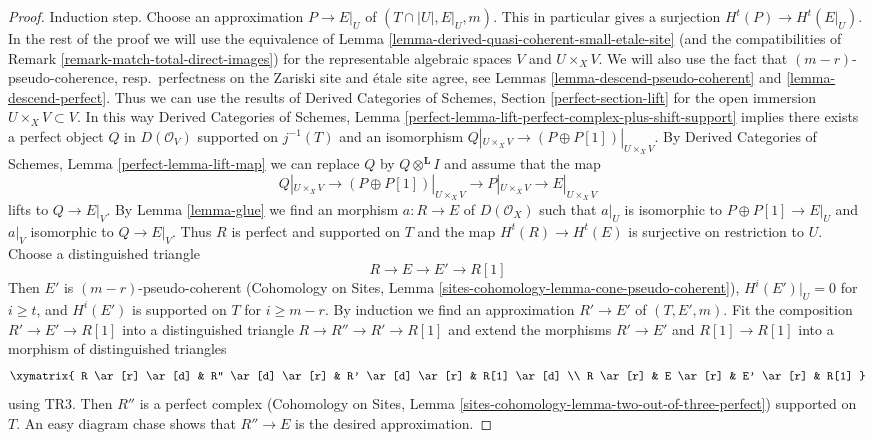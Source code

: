 \begin{proof}
\medskip\noindent
Induction step. Choose an approximation $P \to E|_U$ of
$(T \cap |U|, E|_U, m)$. This in particular gives a surjection
$H^t(P) \to H^t(E|_U)$.
In the rest of the proof we will use the equivalence of
Lemma \ref{lemma-derived-quasi-coherent-small-etale-site}
(and the compatibilities of Remark \ref{remark-match-total-direct-images})
for the representable algebraic spaces $V$ and $U \times_X V$.
We will also use the fact that $(m - r)$-pseudo-coherence,
resp.\ perfectness on the Zariski site and \'etale site agree, see
Lemmas \ref{lemma-descend-pseudo-coherent} and
\ref{lemma-descend-perfect}.
Thus we can use the results of
Derived Categories of Schemes, Section \ref{perfect-section-lift}
for the open immersion $U \times_X V \subset V$. In this way
Derived Categories of Schemes,
Lemma \ref{perfect-lemma-lift-perfect-complex-plus-shift-support}
implies there exists a perfect object $Q$ in $D(\mathcal{O}_V)$
supported on $j^{-1}(T)$ and an isomorphism
$Q|_{U \times_X V} \to (P \oplus P[1])|_{U \times_X V}$. By
Derived Categories of Schemes, Lemma \ref{perfect-lemma-lift-map}
we can replace $Q$ by $Q \otimes^\mathbf{L} I$
and assume that the map
$$
Q|_{U \times_X V} \longrightarrow
(P \oplus P[1])|_{U \times_X V} \longrightarrow
P|_{U \times_X V} \longrightarrow E|_{U \times_X V}
$$
lifts to $Q \to E|_V$. By Lemma \ref{lemma-glue}
we find an morphism $a : R \to E$ of $D(\mathcal{O}_X)$
such that $a|_U$ is isomorphic to $P \oplus P[1] \to E|_U$
and $a|_V$ isomorphic to $Q \to E|_V$.
Thus $R$ is perfect and supported on $T$
and the map $H^t(R) \to H^t(E)$ is surjective on restriction to $U$.
Choose a distinguished triangle
$$
R \to E \to E' \to R[1]
$$
Then $E'$ is $(m - r)$-pseudo-coherent
(Cohomology on Sites, Lemma \ref{sites-cohomology-lemma-cone-pseudo-coherent}),
$H^i(E')|_U = 0$ for $i \geq t$, and
$H^i(E')$ is supported on $T$ for $i \geq m - r$.
By induction we find an approximation $R' \to E'$
of $(T, E', m)$. Fit the composition $R' \to E' \to R[1]$
into a distinguished triangle $R \to R'' \to R' \to R[1]$
and extend the morphisms $R' \to E'$ and $R[1] \to R[1]$ into
a morphism of distinguished triangles
$$
\xymatrix{
R \ar[r] \ar[d] & R'' \ar[d] \ar[r] & R' \ar[d] \ar[r] & R[1] \ar[d] \\
R \ar[r] &  E \ar[r] & E' \ar[r] & R[1]
}
$$
using TR3. Then $R''$ is a perfect complex
(Cohomology on Sites, Lemma
\ref{sites-cohomology-lemma-two-out-of-three-perfect})
supported on $T$. An easy diagram chase shows that $R'' \to E$ is the desired
approximation.
\end{proof}

